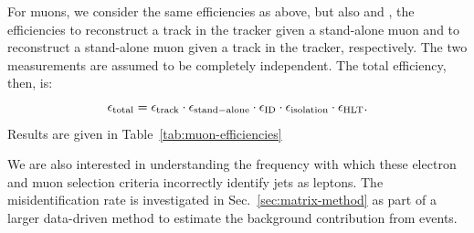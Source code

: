 For muons, we consider the same efficiencies as above, but also \efftrk{} and \effsta{}, the efficiencies to reconstruct a track in the tracker given a stand-alone muon and to reconstruct a stand-alone muon given a track in the tracker, respectively.  The two measurements are assumed to be completely independent.  The total efficiency, then, is:
\begin{equation}
  \label{eq:factorized-eff-muon}
  \epsilon_\mathrm{total} = \epsilon_\mathrm{track} \cdot \epsilon_\mathrm{stand-alone} \cdot \epsilon_\mathrm{ID} \cdot \epsilon_\mathrm{isolation} \cdot \epsilon_\mathrm{HLT}.
\end{equation}
Results are given in Table~\ref{tab:muon-efficiencies}

We are also interested in understanding the frequency with which these electron and muon selection criteria incorrectly identify jets as leptons.  The misidentification rate is investigated in Sec.~\ref{sec:matrix-method} as part of a larger data-driven method to estimate the background contribution from \Zjets{} events.

